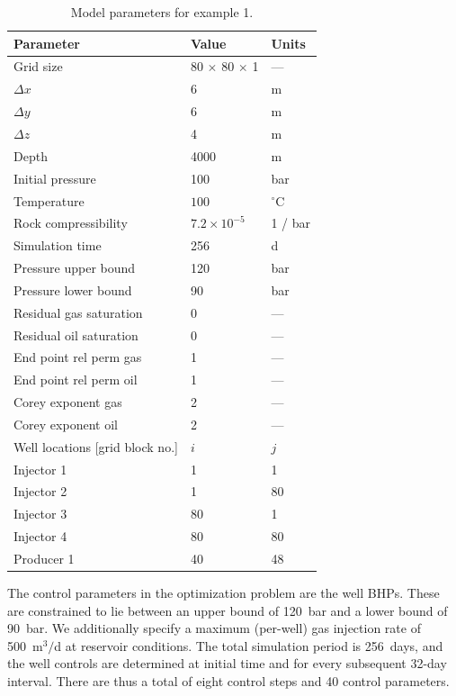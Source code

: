 %
\begin{table}
\tabcolsep=0pt
\centering
\caption{Model parameters for example 1.}
\label{table:PI}
\begin{tabular*}{84mm}{@{\extracolsep\fill}lll}\toprule
Parameter                & Value    & Units \\
\midrule
Grid size                & 80 $\times$ 80 $\times$ 1 &  ---  \\
$\Delta x$               & 6 &m          \\
$\Delta y$               & 6 &m          \\
$\Delta z$               & 4&m         \\
Depth                    & 4000&m           \\
Initial pressure         & 100  & bar        \\
Temperature              &$100$ & $^\circ$C     \\
Rock compressibility     & $7.2 \times 10^{-5}$ & 1 / bar \\
Simulation time          &256 & d           \\
Pressure upper bound     & 120 & bar        \\
Pressure lower bound     &  90 & bar        \\
Residual gas saturation  & 0 & ---          \\
Residual oil saturation  & 0 & ---          \\
End point rel perm gas   & 1 & ---          \\
End point rel perm oil   & 1 & ---          \\
Corey exponent gas       & 2 & ---          \\
Corey exponent oil       & 2 & ---          \\[2pt]
\bottomrule
Well locations [grid block no.] & $i$ & $j$ \\
\midrule
Injector 1               &   1&  1   \\
Injector 2               &   1& 80   \\
Injector 3               &  80&  1   \\
Injector 4               &  80& 80   \\
Producer 1               &  40& 48   \\[2pt]
\bottomrule
\end{tabular*}
\end{table}
%



The control parameters in the optimization problem are the well BHPs. These are constrained to lie between an
upper bound of 120~bar and a lower bound of 90~bar. We additionally specify a
maximum (per-well) gas injection rate of 500~m$^3/$d at reservoir conditions.
The total simulation period is 256~days, and the well controls are determined
at initial time and for every subsequent 32-day interval. There are thus a
total of eight control steps and 40 control parameters.

